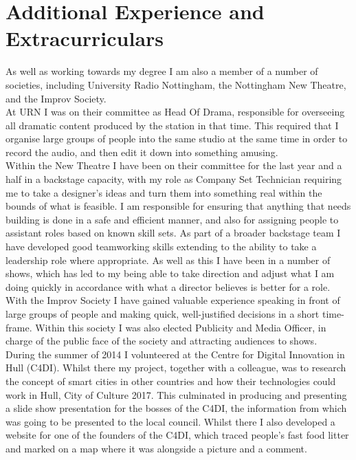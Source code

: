 \documentclass[10pt]{article}
\begin{document}
\section*{Additional Experience and Extracurriculars}

As well as working towards my degree I am also a member of a number of societies, including University Radio Nottingham, the Nottingham New Theatre, and the Improv Society.\\

At URN I was on their committee as Head Of Drama, responsible for overseeing all dramatic content produced by the station in that time.
This required that I organise large groups of people into the same studio at the same time in order to record the audio, and then edit it down into something amusing.\\

Within the New Theatre I have been on their committee for the last year and a half in a backstage capacity, with my role as Company Set Technician requiring me to take a designer's ideas and turn them into something real within the bounds of what is feasible.
I am responsible for ensuring that anything that needs building is done in a safe and efficient manner, and also for assigning people to assistant roles based on known skill sets.
As part of a broader backstage team I have developed good teamworking skills extending to the ability to take a leadership role where appropriate.
As well as this I have been in a number of shows, which has led to my being able to take direction and adjust what I am doing quickly in accordance with what a director believes is better for a role.\\

With the Improv Society I have gained valuable experience speaking in front of large groups of people and making quick, well-justified decisions in a short time-frame.
Within this society I was also elected Publicity and Media Officer, in charge of the public face of the society and attracting audiences to shows.\\

During the summer of 2014 I volunteered at the Centre for Digital Innovation in Hull (C4DI).
Whilst there my project, together with a colleague, was to research the concept of smart cities in other countries and how their technologies could work in Hull, City of Culture 2017.
This culminated in producing and presenting a slide show presentation for the bosses of the C4DI, the information from which was going to be presented to the local council.
Whilst there I also developed a website for one of the founders of the C4DI, which traced people's fast food litter and marked on a map where it was alongside a picture and a comment.
\end{document}

